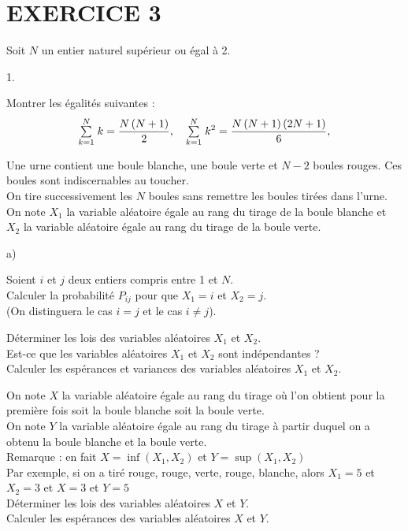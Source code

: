 \documentclass[11pt]{article}%
\begin{document}
\section*{EXERCICE 3}

Soit $N$ un entier naturel supérieur ou égal à 2.

\begin{noliste}{1.}
 \setlength{\itemsep}{4mm}
\item Montrer les égalités suivantes : 
\[
{\textstyle\sum\limits_{k = 1}^{N}}\hspace{.1cm}k = \dfrac{N\left( N + 1\right) }{2},\quad
{\textstyle\sum\limits_{k = 1}^{N}}\hspace{.1cm}k^{2} = \dfrac{N\left( N + 1\right) \left( 2N + 1\right)
}{6},
\]

\item Une urne contient une boule blanche, une boule verte et $N-2$
boules
rouges. Ces boules sont indiscernables au toucher.\\
On tire successivement les $N$ boules sans remettre les boules tirées
dans
l'urne.\\
On note $X_{1}$ la variable aléatoire égale au rang du tirage de la
boule
blanche et $X_{2}$ la variable aléatoire égale au rang du tirage de la
boule
verte.

\begin{noliste}{a)}
 \setlength{\itemsep}{2mm}
\item Soient $i$ et $j$ deux entiers compris entre 1 et $N$.\\
Calculer la probabilité $P_{ij}$ pour que $X_{1} = i$ et $X_{2} = j$.\\
(On distinguera le cas $i = j$ et le cas $i\neq j$).

\item Déterminer les lois des variables aléatoires $X_{1}$ et
$X_{2}$.\\
Est-ce que les variables aléatoires $X_{1}$ et $X_{2}$ sont
indépendantes ?\\
Calculer les espérances et variances des variables aléatoires $X_{1}$
et $X_{2}$.

\item On note $X$ la variable aléatoire égale au rang du tirage où l'on
obtient pour la première fois soit la boule blanche soit la boule
verte.\\
On note $Y$ la variable aléatoire égale au rang du tirage à partir
duquel on
a obtenu la boule blanche et la boule verte.\\
Remarque : en fait $X = \inf \left( X_{1},X_{2}\right) $ et $Y = \sup
\left(
X_{1},X_{2}\right) $\\
Par exemple, si on a tiré rouge, rouge, verte, rouge, blanche, alors
$X_{1} = 5
$ et $X_{2} = 3$ et $X = 3$ et $Y = 5$\\
Déterminer les lois des variables aléatoires $X$ et $Y$.\\
Calculer les espérances des variables aléatoires $X$ et $Y$.
\end{noliste}
\end{noliste}
\end{document}

